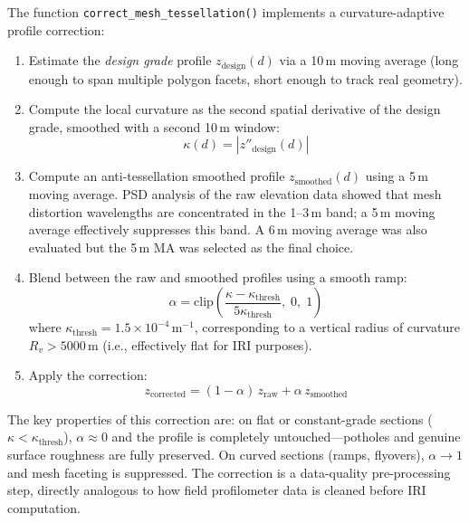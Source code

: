\documentclass[conference]{IEEEtran}
\begin{document}
The function \texttt{correct\_mesh\_tessellation()} implements a curvature-adaptive profile correction:

\begin{enumerate}
    \item Estimate the \textit{design grade} profile $z_{\text{design}}(d)$ via a 10\,m moving average (long enough to span multiple polygon facets, short enough to track real geometry).
    \item Compute the local curvature as the second spatial derivative of the design grade, smoothed with a second 10\,m window:
    \begin{equation}
    \label{eq:curvature}
    \kappa(d) = \left| z''_{\text{design}}(d) \right|
    \end{equation}
    \item Compute an anti-tessellation smoothed profile $z_{\text{smoothed}}(d)$ using a 5\,m moving average.
PSD analysis of the raw elevation data showed that mesh distortion wavelengths are concentrated in the 1--3\,m band;
a 5\,m moving average effectively suppresses this band. A 6\,m moving average was also evaluated but the 5\,m MA was selected as the final choice.
    \item Blend between the raw and smoothed profiles using a smooth ramp:
    \begin{equation}
    \label{eq:alpha}
    \alpha = \text{clip}\!\left(\frac{\kappa - \kappa_{\text{thresh}}}{5\kappa_{\text{thresh}}},\; 0,\; 1\right)
    \end{equation}
    where $\kappa_{\text{thresh}} = 1.5 \times 10^{-4}\,\text{m}^{-1}$, corresponding to a vertical radius of curvature $R_v > 5000\,\text{m}$ (i.e., effectively flat for IRI purposes).
    \item Apply the correction:
    \begin{equation}
    \label{eq:correction}
    z_{\text{corrected}} = (1 - \alpha)\,z_{\text{raw}} + \alpha\,z_{\text{smoothed}}
    \end{equation}
\end{enumerate}

The key properties of this correction are: on flat or constant-grade sections ($\kappa < \kappa_{\text{thresh}}$), $\alpha \approx 0$ and the profile is completely untouched---potholes and genuine surface roughness are fully preserved.
On curved sections (ramps, flyovers), $\alpha \to 1$ and mesh faceting is suppressed.
The correction is a data-quality pre-processing step, directly analogous to how field profilometer data is cleaned before IRI computation.
\end{document}

